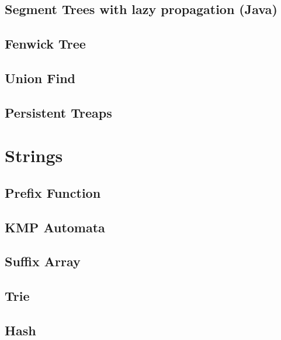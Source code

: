 \subsection{Segment Trees with lazy propagation (Java)}
\raggedbottom
\hrulefill
\subsection{Fenwick Tree}
\raggedbottom
\hrulefill
\subsection{Union Find}
\raggedbottom
\hrulefill
\subsection{Persistent Treaps}
\raggedbottom
\hrulefill

\section{Strings}
\subsection{Prefix Function}
\raggedbottom
\hrulefill
\subsection{KMP Automata}
\raggedbottom
\hrulefill
\subsection{Suffix Array}
\raggedbottom
\hrulefill
\subsection{Trie}
\raggedbottom
\hrulefill
\subsection{Hash}
\raggedbottom
\hrulefill

